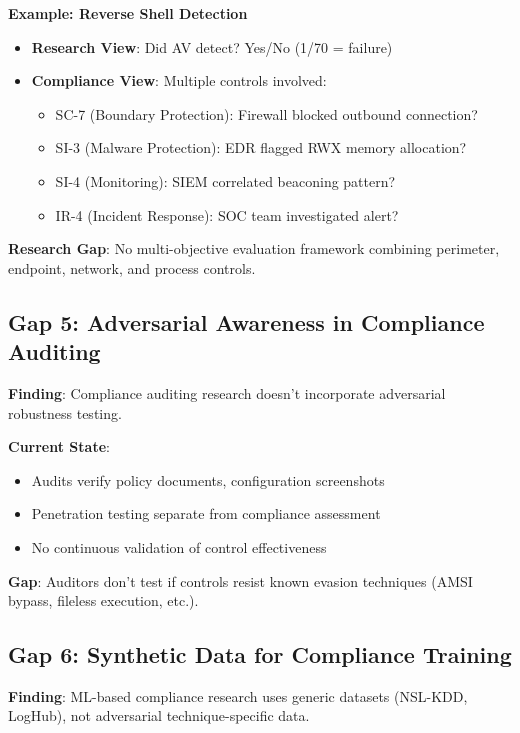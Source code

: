 \documentclass[11pt,conference]{IEEEtran}
\begin{document}
\textbf{Example: Reverse Shell Detection}
\begin{itemize}
    \item \textbf{Research View}: Did AV detect? Yes/No (1/70 = failure)
    \item \textbf{Compliance View}: Multiple controls involved:
    \begin{itemize}
        \item SC-7 (Boundary Protection): Firewall blocked outbound connection?
        \item SI-3 (Malware Protection): EDR flagged RWX memory allocation?
        \item SI-4 (Monitoring): SIEM correlated beaconing pattern?
        \item IR-4 (Incident Response): SOC team investigated alert?
    \end{itemize}
\end{itemize}

\textbf{Research Gap}: No multi-objective evaluation framework combining perimeter, endpoint, network, and process controls.

\subsection{Gap 5: Adversarial Awareness in Compliance Auditing}

\textbf{Finding}: Compliance auditing research doesn't incorporate adversarial robustness testing.

\textbf{Current State}:
\begin{itemize}
    \item Audits verify policy documents, configuration screenshots
    \item Penetration testing separate from compliance assessment
    \item No continuous validation of control effectiveness
\end{itemize}

\textbf{Gap}: Auditors don't test if controls resist known evasion techniques (AMSI bypass, fileless execution, etc.).

\subsection{Gap 6: Synthetic Data for Compliance Training}

\textbf{Finding}: ML-based compliance research uses generic datasets (NSL-KDD, LogHub), not adversarial technique-specific data.
\end{document}
